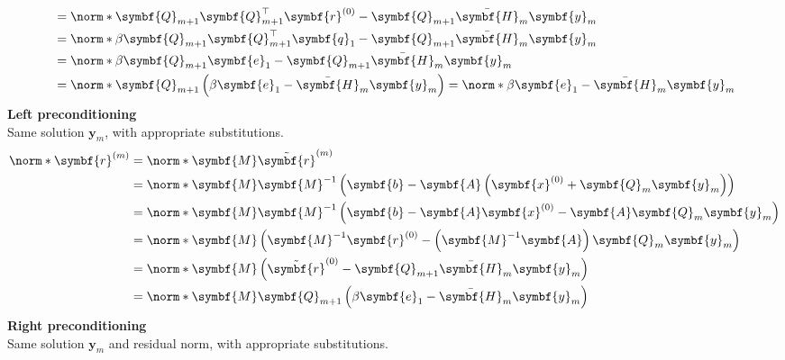 \documentclass{article}
\begin{document}
\begin{multicols}{2}
\begin{align*}
                                             & = \norm*{\symbf{Q}_{m+1} \symbf{Q}_{m+1}^\top \symbf{r}^{\left( 0 \right)} - \symbf{Q}_{m+1} \bar{\symbf{H}}_m \symbf{y}_m}                            \\
                                             & = \norm*{\beta \symbf{Q}_{m+1} \symbf{Q}_{m+1}^\top \symbf{q}_1 - \symbf{Q}_{m+1} \bar{\symbf{H}}_m \symbf{y}_m}                                       \\
                                             & = \norm*{\beta \symbf{Q}_{m+1} \symbf{e}_1 - \symbf{Q}_{m+1} \bar{\symbf{H}}_m \symbf{y}_m}                                                            \\
                                             & = \norm*{\symbf{Q}_{m+1} \left( \beta \symbf{e}_1 - \bar{\symbf{H}}_m \symbf{y}_m \right)} = \norm*{\beta \symbf{e}_1 - \bar{\symbf{H}}_m \symbf{y}_m}
    \end{align*}
    \textbf{Left preconditioning} \\
    Same solution \(\symbf{y}_m\), with appropriate substitutions.
    \begin{align*}
        \norm*{\symbf{r}^{\left( m \right)}} & = \norm*{\symbf{M} \tilde{\symbf{r}}^{\left( m \right)}}                                                                                                     \\
                                             & = \norm*{\symbf{M} \symbf{M}^{-1} \left( \symbf{b} - \symbf{A} \left( \symbf{x}^{\left( 0 \right)} + \symbf{Q}_m \symbf{y}_m \right) \right)}                \\
                                             & = \norm*{\symbf{M} \symbf{M}^{-1} \left( \symbf{b} - \symbf{A} \symbf{x}^{\left( 0 \right)} - \symbf{A} \symbf{Q}_m \symbf{y}_m \right)}                     \\
                                             & = \norm*{\symbf{M} \left( \symbf{M}^{-1} \symbf{r}^{\left( 0 \right)} - \left( \symbf{M}^{-1} \symbf{A} \right) \symbf{Q}_m \symbf{y}_m \right)}             \\
                                             & = \norm*{\symbf{M} \left( \tilde{\symbf{r}}^{\left( 0 \right)} - \symbf{Q}_{m+1} \bar{\symbf{H}}_m \symbf{y}_m \right)}                                      \\
                                             & = \norm*{\symbf{M} \symbf{Q}_{m+1} \left( \beta \symbf{e}_1 - \bar{\symbf{H}}_m \symbf{y}_m \right)}
    \end{align*}
    \textbf{Right preconditioning} \\
    Same solution \(\symbf{y}_m\) and residual norm, with appropriate
    substitutions.
\end{multicols}
\end{document}
